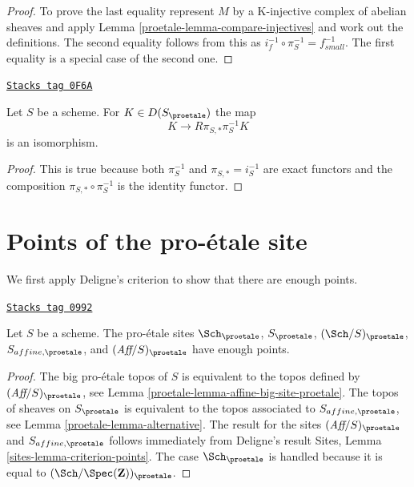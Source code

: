 \begin{proof}

To prove the last equality represent $M$
by a K-injective complex of abelian sheaves
and apply Lemma \ref{proetale-lemma-compare-injectives}
and work out the definitions. The second equality follows from
this as $i_f^{-1} \circ \pi_S^{-1} = f_{small}^{-1}$. The first
equality is a special
case of the second one.
\end{proof}

\begin{lemma}
\label{proetale-lemma-cohomological-descent-proetale}
\href{https://stacks.math.columbia.edu/tag/0F6A}{\texttt{Stacks tag 0F6A}}

Let $S$ be a scheme. For $K \in D(S_\proetale)$ the map
$$
K \longrightarrow R\pi_{S, *}\pi_S^{-1}K
$$
is an isomorphism.
\end{lemma}

\begin{proof}
This is true because both $\pi_S^{-1}$ and $\pi_{S, *} = i_S^{-1}$
are exact functors and the composition $\pi_{S, *} \circ \pi_S^{-1}$
is the identity functor.
\end{proof}

\section{Points of the pro-\'etale site}
\label{proetale-section-points}
We first apply Deligne's criterion to show that there are enough points.

\begin{lemma}
\label{proetale-lemma-points-proetale}
\href{https://stacks.math.columbia.edu/tag/0992}{\texttt{Stacks tag 0992}}

Let $S$ be a scheme. The pro-\'etale sites $\Sch_\proetale$,
$S_\proetale$, $(\Sch/S)_\proetale$, $S_{affine, \proetale}$, and
$(\textit{Aff}/S)_\proetale$ have enough points.
\end{lemma}

\begin{proof}

The big pro-\'etale topos of $S$ is equivalent to the topos defined by
$(\textit{Aff}/S)_\proetale$, see
Lemma \ref{proetale-lemma-affine-big-site-proetale}.
The topos of sheaves on $S_\proetale$ is equivalent to the topos
associated to $S_{affine, \proetale}$, see
Lemma \ref{proetale-lemma-alternative}.
The result for the sites $(\textit{Aff}/S)_\proetale$ and
$S_{affine, \proetale}$ follows immediately from Deligne's result
Sites, Lemma \ref{sites-lemma-criterion-points}.
The case $\Sch_\proetale$ is handled because it is equal to
$(\Sch/\Spec(\mathbf{Z}))_\proetale$.
\end{proof}

